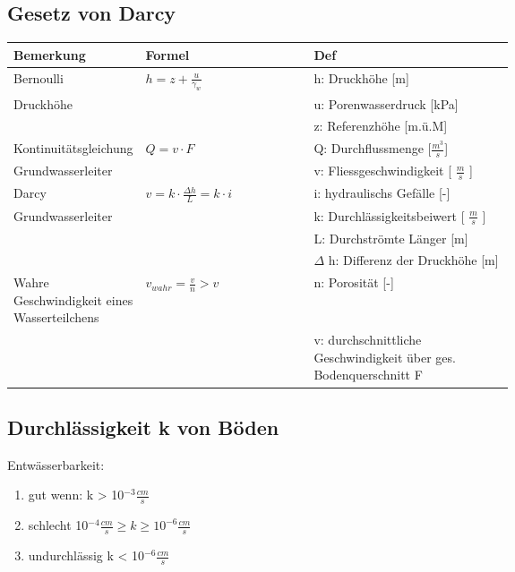 \begin{minipage}{0.7\linewidth}
	\subsection{Gesetz von Darcy}
	\begin{tabular}{p{0.25\linewidth}|l|p{0.4\linewidth}}
		Bemerkung	&	Formel			&	Def \\ \hline
		Bernoulli	&	$ h = z + \frac{u}{\gamma_w} $	&	h: Druckhöhe [m] \\
		Druckhöhe	&					& u: Porenwasserdruck [kPa] \\
					&					& z: Referenzhöhe [m.ü.M] \\ \hline
		Kontinuitätsgleichung	&	$ Q = v \cdot F $ 	& Q: Durchflussmenge [$ \frac{m^3}{s} $] \\
		Grundwasserleiter &					& v: Fliessgeschwindigkeit [ $ \frac{m}{s} $ ] \\ \hline
		Darcy		&  $ v = k \cdot\frac{\Delta h}{L} = k \cdot i $ &	i: hydraulischs Gefälle [-] \\
		Grundwasserleiter &				& k: Durchlässigkeitsbeiwert [ $ \frac{m}{s} $ ] \\
					&					& L: Durchströmte Länger [m] \\
					&					& $ \Delta $ h: Differenz der Druckhöhe [m] \\ \hline
		Wahre Geschwindigkeit eines Wasserteilchens &	$ v_{wahr} = \frac{v}{n} > v $	&	n: Porosität [-] \\
					&					& v: durchschnittliche Geschwindigkeit über ges. Bodenquerschnitt F \\
	\end{tabular}
\end{minipage}
\begin{minipage}{0.4\linewidth}
	\subsection{Durchlässigkeit k von Böden}
		
	Entwässerbarkeit:
	\begin{enumerate}
		\item gut wenn: k > 10$^{-3} \frac{cm}{s} $
		\item schlecht 10$^{-4}\frac{cm}{s} \geq k \geq 10^{-6} \frac{cm}{s} $
		\item undurchlässig k < 10$^{-6} \frac{cm}{s} $
	\end{enumerate}
\end{minipage}

